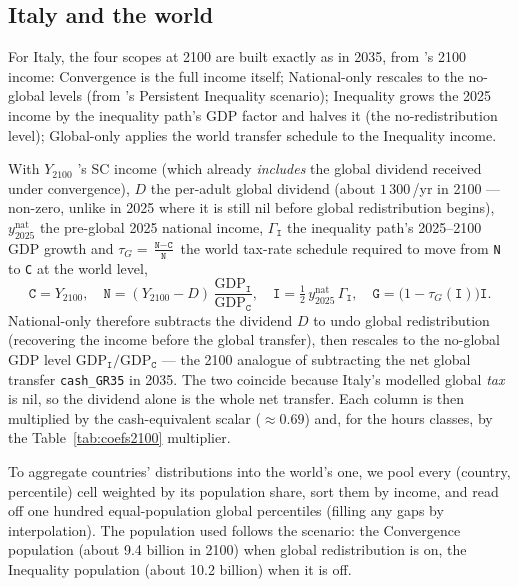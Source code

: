 \documentclass[12pt,a4paper]{article}
\newcommand{\scenario}[1]{\texttt{#1}}
\newcommand{\col}[1]{\texttt{#1}}
\newcommand{\EUR}{\texteuro}
\begin{document}
\subsection{Italy and the world}

For Italy, the four scopes at 2100 are built exactly as in 2035, from \citet{Bothe2026}'s 2100 income: Convergence is the full income itself; National-only rescales to the no-global levels (from \citet{Bothe2026}'s Persistent Inequality scenario); Inequality grows the 2025 income by the inequality path's GDP factor and halves it (the no-redistribution level); Global-only applies the world transfer schedule to the Inequality income.

With $Y_{2100}$ \citeauthor{Bothe2026}'s SC income (which already \emph{includes} the global dividend received under convergence), $D$ the per-adult global dividend (about $1\,300$\,\EUR/yr in 2100 --- non-zero, unlike in 2025 where it is still nil before global redistribution begins), $y^{\mathrm{nat}}_{2025}$ the pre-global 2025 national income, $\Gamma_{\scenario{I}}$ the inequality path's 2025--2100 GDP growth and $\tau_G = \frac{\scenario{N} - \scenario{C}}{\scenario{N}}$ the world tax-rate schedule required to move from \scenario{N} to \scenario{C} at the world level, %
\[
  \scenario{C}=Y_{2100},\quad
  \scenario{N}=(Y_{2100}-D)\,\frac{\mathrm{GDP}_{\scenario{I}}}{\mathrm{GDP}_{\scenario{C}}},\quad
  \scenario{I}=\tfrac12\,y^{\mathrm{nat}}_{2025}\,\Gamma_{\scenario{I}},\quad
  \scenario{G}=\bigl(1-\tau_G(\scenario{I})\bigr)\scenario{I}.
\]
National-only therefore subtracts the dividend $D$ to undo global redistribution (recovering the income before the global transfer), then rescales to the no-global GDP level $\mathrm{GDP}_{\scenario{I}}/\mathrm{GDP}_{\scenario{C}}$ --- the 2100 analogue of subtracting the net global transfer \col{cash\_GR35} in 2035. The two coincide because Italy's modelled global \emph{tax} is nil, so the dividend alone is the whole net transfer. Each column is then multiplied by the cash-equivalent scalar ($\approx0.69$) and, for the hours classes, by the Table~\ref{tab:coefs2100} multiplier.

To aggregate countries' distributions into the world's one, we pool every (country, percentile) cell weighted by its population share, sort them by income, and read off one hundred equal-population global percentiles (filling any gaps by interpolation). The population used follows the scenario: the Convergence population (about 9.4 billion in 2100) when global redistribution is on, the Inequality population (about 10.2 billion) when it is off.
\end{document}
